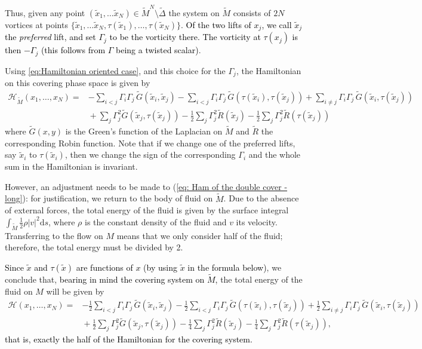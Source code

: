 \documentclass[11pt,twoside]{article}
\theoremstyle{definition}
\numberwithin{equation}{section}
\def\Mt{\widetilde{M}}
\def\Gt{\widetilde{G}}
\def\Rt{\widetilde{R}}
\def\xt{\tilde{x}}
\begin{document}
Thus, given any point $(\xt_1,\dots \xt_N)\in\Mt^N\setminus \widetilde{\Delta}$ the system on $\Mt$ consists of $2N$ vortices at points $\{\xt_1,\dots\xt_N,\tau(\xt_1),\dots,\tau(\xt_N)\}$. 
\textcolor{black}{Of the two lifts of $x_j$, we call $\xt_j$ the \emph{preferred} lift, and set $\Gamma_j$ to be the vorticity there. The vorticity at $\tau(x_j)$ is then $-\Gamma_j$ (this follows from $\Gamma$ being a twisted scalar)}. 


Using \eqref{eq:Hamiltonian oriented case}, and this choice for the $\Gamma_j$, the Hamiltonian on this covering phase space is given by 
\begin{equation} \label{eq: Ham of the double cover - long}
\begin{split}
   \mathcal{H}_{\Mt}(x_1,\ldots,x_N) =&  -\sum_{i< j}\Gamma_i\Gamma_j\,\Gt(\xt_i,\xt_j)
   	-\sum_{i< j}\Gamma_i\Gamma_j\,\Gt(\tau(\xt_i),\tau(\xt_j)) 
   +\sum_{i\neq  j}\Gamma_i\Gamma_j\,\Gt(\xt_i,\tau(\xt_j)) \\
    &{}+ \sum_j\Gamma_j^2\Gt(\xt_j,\tau(\xt_j))  - \frac12\sum_j\Gamma_j^2\Rt(\xt_j)- \frac12\sum_j\Gamma_j^2\Rt(\tau(\xt_j))
    \end{split}
\end{equation}
where $\Gt(x,y)$ is the Green's function of the Laplacian  on $\Mt$ and $\Rt$ the corresponding  Robin function.
{\red Note that if we change one of the preferred lifts, say $\xt_i$ to $\tau(\xt_i)$, then we change the sign of the corresponding $\Gamma_i$ and the whole sum in the Hamiltonian is invariant.} 


However, an adjustment needs to be made to (\ref{eq: Ham of the double cover - long}): for justification, we return to the body of fluid on  $\Mt$. Due to the absence of external forces, the total energy of the fluid  is given by the surface integral $\int_{\Mt}\frac12\rho|v|^2\mathrm{d}s$, where $\rho$ is the constant density of the fluid and $v$ its velocity. Transferring to the flow on $M$  means that we only consider half of the fluid; therefore, the total energy must be divided by 2. 

\textcolor{black}{Since $\xt $ and $\tau(\xt)$ are functions of $x$ (by using $\xt$ in the formula below)}, we conclude that, \textcolor{black}{bearing in mind the covering system on $\Mt$,} the total energy of the fluid on $M$ will be given by 
\begin{equation}
\label{eq: Hamiltonian on mtilde halved}
    \begin{split}
         \mathcal{H}(x_1,\ldots,x_N) =&  -\frac12\sum_{i< j}\Gamma_i\Gamma_j\,\Gt(\xt_i,\xt_j)
   	-\frac12\sum_{i< j}\Gamma_i\Gamma_j\,\Gt(\tau(\xt_i),\tau(\xt_j)) 
   +\frac12\sum_{i\neq  j}\Gamma_i\Gamma_j\,\Gt(\xt_i,\tau(\xt_j)) \\
    &{}+ \frac12\sum_j\Gamma_j^2\Gt(\xt_j,\tau(\xt_j))  - \frac14\sum_j\Gamma_j^2\Rt(\xt_j)- \frac14\sum_j\Gamma_j^2\Rt(\tau(\xt_j)),
    \end{split}
\end{equation}
\textcolor{black}{that is, exactly the half of the Hamiltonian for the covering system. }
\end{document}
